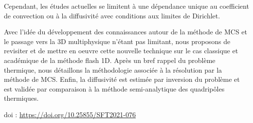{Cependant, les études actuelles se limitent à une dépendance unique au coefficient de convection ou à la diffusivité avec conditions aux limites de Dirichlet. 



Avec l'idée du développement des connaissances autour de la méthode de MCS et le passage vers la 3D multiphysique n'étant pas limitant, nous proposons de revisiter et de mettre en oeuvre cette nouvelle technique sur le cas classique et académique de la méthode flash 1D. Après un bref rappel du problème thermique, nous détaillons la méthodologie associée à la résolution par la méthode de MCS. Enfin, la diffusivité est estimée par inversion du problème et est validée par comparaison à la méthode semi-analytique des quadripôles thermiques.

 \vfill doi : \url{https://doi.org/10.25855/SFT2021-076}

}
 
